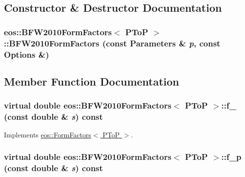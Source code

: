 \subsection{Constructor \& Destructor Documentation}
\hypertarget{classeos_1_1BFW2010FormFactors_3_01PToP_01_4_ab61100fd229569f4b530cc47e6ef92e0}{
\subsubsection[{BFW2010FormFactors}]{\setlength{\rightskip}{0pt plus 5cm}eos::BFW2010FormFactors$<$ {\bf PToP} $>$::BFW2010FormFactors (const {\bf Parameters} \& {\em p}, \/  const {\bf Options} \&)}}
\label{classeos_1_1BFW2010FormFactors_3_01PToP_01_4_ab61100fd229569f4b530cc47e6ef92e0}


\subsection{Member Function Documentation}
\hypertarget{classeos_1_1BFW2010FormFactors_3_01PToP_01_4_ac48fd26a92111d4158f26d2189c309e9}{
\subsubsection[{f\_\-0}]{\setlength{\rightskip}{0pt plus 5cm}virtual double eos::BFW2010FormFactors$<$ {\bf PToP} $>$::f\_ (const double \& {\em s}) const}}
\label{classeos_1_1BFW2010FormFactors_3_01PToP_01_4_ac48fd26a92111d4158f26d2189c309e9}


Implements \hyperlink{classeos_1_1FormFactors_3_01PToP_01_4_a097a12cde6acb9004d1a92cbb8e60734}{eos::FormFactors$<$ PToP $>$}.\hypertarget{classeos_1_1BFW2010FormFactors_3_01PToP_01_4_aa059ad4f00d290d3729b9b6bed6be171}{
\subsubsection[{f\_\-p}]{\setlength{\rightskip}{0pt plus 5cm}virtual double eos::BFW2010FormFactors$<$ {\bf PToP} $>$::f\_\-p (const double \& {\em s}) const}}
\label{classeos_1_1BFW2010FormFactors_3_01PToP_01_4_aa059ad4f00d290d3729b9b6bed6be171}


